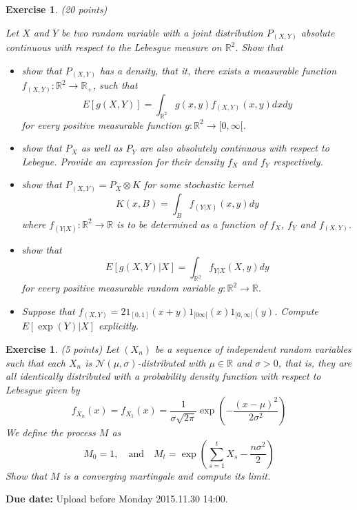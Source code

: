 \documentclass[DIV=classic,a4paper,10pt]{scrartcl}
\newtheorem{exercise}[theorem]{Exercise}
\theoremstyle{nonumberplain}
\newtheorem{proof}{Proof}
\numberwithin{equation}{section}
\begin{document}
\begin{exercise}(20 points)

    Let $X$ and $Y$ be two random variable with a joint distribution $P_{(X,Y)}$ absolute continuous with respect to the Lebesgue measure on $\mathbb{R}^2$.
    Show that
    \begin{itemize}
        \item show that $P_{(X,Y)}$ has a density, that it, there exists a measurable function $f_{(X,Y)}:\mathbb{R}^2\to \mathbb{R}_+$, such that
            \begin{equation*}
                E\left[ g(X,Y) \right]=\int_{\mathbb{R}^2} g(x,y)f_{(X,Y)}(x,y) dx dy
            \end{equation*}
            for every positive measurable function $g:\mathbb{R}^2\to [0,\infty[$.
        \item show that $P_X$ as well as $P_Y$ are also absolutely continuous with respect to Lebegue.
            Provide an expression for their density $f_X$ and $f_Y$ respectively.
        \item show that $P_{(X,Y)}=P_X\otimes K$ for some stochastic kernel
            \begin{equation*}
                K(x,B)=\int_{B}^{} f_{(Y|X)}(x,y)dy
            \end{equation*}
            where $f_{(Y|X)}:\mathbb{R}^2\to \mathbb{R}$ is to be determined as a function of $f_X$, $f_Y$ and $f_{(X,Y)}$.
        \item show that 
            \begin{equation*}
                E\left[ g(X,Y) | X\right]=\int_{\mathbb{R}^2}^{} f_{Y|X}(X,y) dy
            \end{equation*}
            for every positive measurable random variable $g:\mathbb{R}^2\to \mathbb{R}$.
        \item Suppose that $f_{(X,Y)}=21_{[0,1]}(x+y)1_{[0\infty[}(x)1_{[0,\infty[}(y)$.
            Compute $E[\exp(Y)|X]$ explicitly.
    \end{itemize}
\end{exercise}

\begin{exercise}(5 points)
    Let $(X_n)$ be a sequence of independent random variables such that each $X_n$ is $\mathcal{N}(\mu,\sigma)$-distributed with $\mu\in \mathbb{R}$ and $\sigma>0$, that is, they are all identically distributed with a probability density function with respect to Lebesgue given by
    \begin{equation*}
        f_{X_n}(x)=f_{X_1}(x)=\frac{1}{\sigma \sqrt{2\pi}}\exp\left( -\frac{(x-\mu)^2}{2\sigma^2} \right)
    \end{equation*}
    We define the process $M$ as
    \begin{equation*}
        M_0=1, \quad \text{and}\quad M_t=\exp\left( \sum_{s=1}^t X_s-\frac{n\sigma^2}{2} \right)
    \end{equation*}
    Show that $M$ is a converging martingale and compute its limit.
\end{exercise}







\smallskip
\noindent
\textbf{Due date:} Upload before Monday 2015.11.30 14:00.
\end{document}

